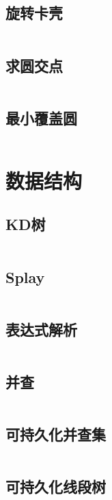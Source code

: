 \documentclass[UTF8]{ctexart}
\begin{document}
\subsection{旋转卡壳}
\inputminted{cpp}{calcgeometry/旋转卡壳.cpp}

\subsection{求圆交点}
\inputminted{cpp}{calcgeometry/求圆交点.cpp}

\subsection{最小覆盖圆}
\inputminted{cpp}{calcgeometry/最小覆盖圆.cpp}

\section{数据结构}

\subsection{KD树}
\inputminted{cpp}{datastructure/KD树.cpp}

\subsection{Splay}
\inputminted{cpp}{datastructure/Splay.cpp}

\subsection{表达式解析}
\inputminted{cpp}{datastructure/表达式解析.cpp}

\subsection{并查}
\inputminted{cpp}{datastructure/并查.cpp}

\subsection{可持久化并查集}
\inputminted{cpp}{datastructure/可持久化并查集.cpp}

\subsection{可持久化线段树}
\inputminted{cpp}{datastructure/可持久化线段树.cpp}
\end{document}
